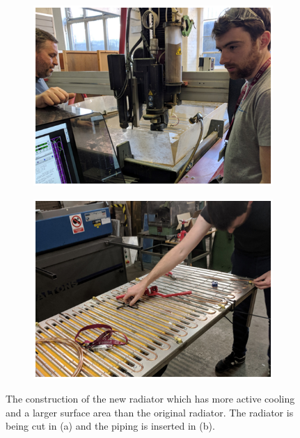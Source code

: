\begin{figure}[!h]
\centering
\begin{subfigure}{.5\textwidth}
  \centering
  \includegraphics[width=\linewidth]{Chapter3/Figs/Raster/detCon011b_RadiatorConstruction.png}
  \captionsetup{width=.9\linewidth}
  \caption{}
  \label{subFig:detCon011b_RadiatorConstruction}
\end{subfigure}%
\begin{subfigure}{.5\textwidth}
  \centering
  \includegraphics[width=\linewidth]{Chapter3/Figs/Raster/detCon012b_RadiatorPiping.png}
  \captionsetup{width=.9\linewidth}
  \caption{}
  \label{subFig:detCon012b_RadiatorPiping}
\end{subfigure}
\caption{The construction of the new radiator which has more active cooling and a larger surface area than the original radiator. The radiator is being cut in (a) and the piping is inserted in (b).}
\label{fig:detCon_RadiatorConstruction_RadiatorPiping}
\end{figure}

